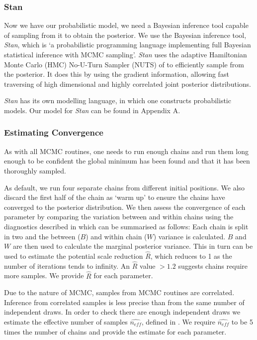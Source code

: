 \documentclass[useAMS,usenatbib]{mnras}
\begin{document}
\subsubsection{Stan}
Now we have our probabilistic model, we need a Bayesian inference tool capable of sampling from it to obtain the posterior. We use the Bayesian inference tool, \textit{Stan}, which is `a probabilistic programming language implementing full Bayesian statistical inference with MCMC sampling'. \textit{Stan} uses the adaptive Hamiltonian Monte Carlo (HMC) No-U-Turn Sampler (NUTS) of \cite{Hoffman:2013} to efficiently sample from the posterior. It does this by using the gradient information, allowing fast traversing of high dimensional and highly correlated joint posterior distributions. 

\textit{Stan} has its own modelling language, in which one constructs probabilistic models. Our model for \textit{Stan} can be found in Appendix A.
\subsubsection{Estimating Convergence}\label{sec:conv}
As with all MCMC routines, one needs to run enough chains and run them long enough to be confident the global minimum has been found and that it has been thoroughly sampled. 

As default, we run four separate chains from different initial positions. We also discard the first half of the chain as `warm up' to ensure the chains have converged to the posterior distribution. We then assess the convergence of each parameter by comparing the variation between and within chains using the diagnostics described in \cite{BDA3} which can be summarised as follows: Each chain is split in two and the between ($B$) and within chain ($W$) variance is calculated. $B$ and $W$ are then used to calculate the marginal posterior variance. This in turn can be used to estimate the potential scale reduction $\hat{R}$, which reduces to 1 as the number of iterations tends to infinity. An $\hat{R}$ value $> 1.2$ suggests chains require more samples. We provide $\hat{R}$ for each parameter.

Due to the nature of MCMC, samples from MCMC routines are correlated. Inference from correlated samples is less precise than from the same number of independent draws. In order to check there are enough independent draws we estimate the effective number of samples $\hat{n_{eff}}$, defined in \cite{BDA3}. We require $\hat{n_{eff}}$ to be 5 times the number of chains and provide the estimate for each parameter.
\end{document}
